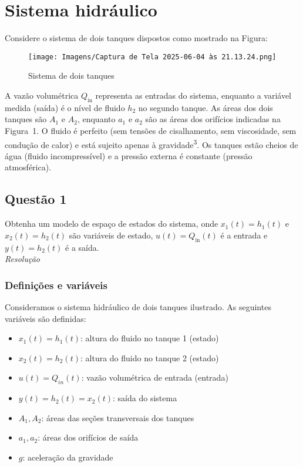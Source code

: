 \documentclass[12pt,a4]{article}
\begin{document}
\tableofcontents
\newpage
\section{Sistema hidráulico}
Considere o sistema de dois tanques dispostos como mostrado na Figura:
\begin{figure}[!hbt]
    \centering
    \texttt{[image: Imagens/Captura de Tela 2025-06-04 às 21.13.24.png]}
    \caption{Sistema de dois tanques }
    \label{fig:enter-label}
\end{figure}

A vazão volumétrica $Q_{\text{in}}$  representa as entradas do sistema, enquanto a variável medida (saída) é o nível de fluido $ h_{2} $ no segundo tanque. As áreas dos dois tanques são $ A_{1} $ e $ A_{2} $, enquanto $a_{1} $ e $ a_{2} $ são as áreas dos orifícios indicadas na Figura~1. O fluido é perfeito (sem tensões de cisalhamento, sem viscosidade, sem condução de calor) e está sujeito apenas à gravidade\textsuperscript{3}. Os tanques estão cheios de água (fluido incompressível) e a pressão externa é constante (pressão atmosférica).
\subsection{Questão 1}

    Obtenha um modelo de espaço de estados do sistema, onde $ x_1(t) = h_1(t) $ e $ x_2(t) = h_2(t) $ são variáveis de estado, $ u(t) = Q_{\text{in}}(t) $  é a entrada e $  y(t) = h_2(t) $  é a saída.\\
    \textit{Resolução}
\subsubsection{Definições e variáveis}

Consideramos o sistema hidráulico de dois tanques ilustrado. As seguintes variáveis são definidas:

\begin{itemize}
  \item $ x_1(t) = h_1(t) $: altura do fluido no tanque 1 (estado)
  \item $ x_2(t) = h_2(t) $: altura do fluido no tanque 2 (estado)
  \item $ u(t) = Q_{in}(t) $: vazão volumétrica de entrada (entrada)
  \item $ y(t) = h_2(t) = x_2(t) $: saída do sistema
  \item $ A_1, A_2 $: áreas das seções transversais dos tanques
  \item $ a_1, a_2 $: áreas dos orifícios de saída
  \item $ g $: aceleração da gravidade
\end{itemize}
\newpage
\end{document}
